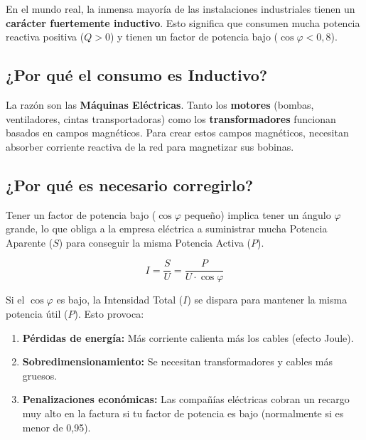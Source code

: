 \documentclass[
  a4paper,
  DIV=11,
  numbers=noendperiod]{scrreprt}
\providecommand{\tightlist}{%
  \setlength{\itemsep}{0pt}\setlength{\parskip}{0pt}}
\begin{document}
En el mundo real, la inmensa mayoría de las instalaciones industriales
tienen un \textbf{carácter fuertemente inductivo}. Esto significa que
consumen mucha potencia reactiva positiva (\(Q > 0\)) y tienen un factor
de potencia bajo (\(\cos \varphi < 0,8\)).

\subsection*{¿Por qué el consumo es
Inductivo?}\label{por-quuxe9-el-consumo-es-inductivo}

La razón son las \textbf{Máquinas Eléctricas}. Tanto los
\textbf{motores} (bombas, ventiladores, cintas transportadoras) como los
\textbf{transformadores} funcionan basados en campos magnéticos. Para
crear estos campos magnéticos, necesitan absorber corriente reactiva de
la red para magnetizar sus bobinas.

\subsection*{¿Por qué es necesario
corregirlo?}\label{por-quuxe9-es-necesario-corregirlo}

Tener un factor de potencia bajo (\(\cos \varphi\) pequeño) implica
tener un ángulo \(\varphi\) grande, lo que obliga a la empresa eléctrica
a suministrar mucha Potencia Aparente (\(S\)) para conseguir la misma
Potencia Activa (\(P\)).

\[
I = \frac{S}{U} = \frac{P}{U \cdot \cos \varphi}
\]

Si el \(\cos \varphi\) es bajo, la Intensidad Total (\(I\)) se dispara
para mantener la misma potencia útil (\(P\)). Esto provoca:

\vspace{-1em}

\begin{enumerate}
\def\labelenumi{\arabic{enumi}.}
\tightlist
\item
  \textbf{Pérdidas de energía:} Más corriente calienta más los cables
  (efecto Joule).
\item
  \textbf{Sobredimensionamiento:} Se necesitan transformadores y cables
  más gruesos.
\item
  \textbf{Penalizaciones económicas:} Las compañías eléctricas cobran un
  recargo muy alto en la factura si tu factor de potencia es bajo
  (normalmente si es menor de 0,95).
\end{enumerate}
\end{document}
